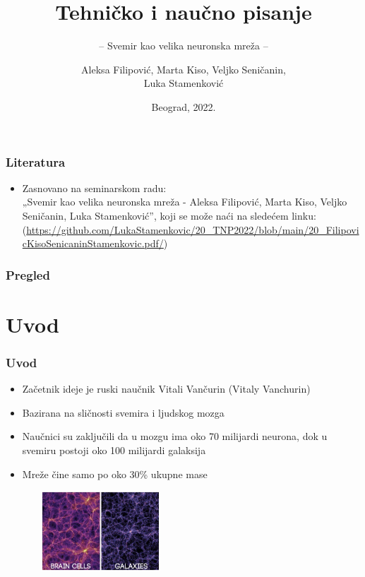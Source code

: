 \documentclass{beamer}
\title{Tehničko i naučno pisanje}
\subtitle{-- Svemir kao velika neuronska mreža --}
\author{Aleksa Filipović, Marta Kiso, Veljko Seničanin, \\Luka Stamenković}
\institute{Matematički fakultet\\Univerzitet u Beogradu}
\date{
	\footnotesize{Beograd, 2022.}	
}
\begin{document}
\begin{frame}
	\thispagestyle{empty}
	\titlepage
\end{frame}

\addtocounter{framenumber}{-1}

\begin{frame}[fragile]\frametitle{Literatura}
	\begin{itemize}
		\item Zasnovano na seminarskom radu:\\
        „Svemir kao velika neuronska mreža - Aleksa Filipović, Marta Kiso, Veljko Seničanin, Luka Stamenković”, koji se može naći na sledećem linku: (\url{https://github.com/LukaStamenkovic/20_TNP2022/blob/main/20_FilipovicKisoSenicaninStamenkovic.pdf/})
	\end{itemize}
\end{frame}

\begin{frame}
	\frametitle{Pregled} %
	\tableofcontents[hidesubsections]
\end{frame}

\section{Uvod}

\begin{frame}[fragile]\frametitle{Uvod}
	\begin{itemize}	
        \item Začetnik ideje je ruski naučnik Vitali Vančurin (Vitaly Vanchurin)
		\item Bazirana na sličnosti svemira i ljudskog mozga
        \item Naučnici su zaključili da u mozgu ima oko 70 milijardi neurona, dok u svemiru postoji oko 100 milijardi galaksija
        \item Mreže čine samo po oko 30\% ukupne mase
        \end{itemize}
       \begin{figure}[h]
        \centering
        \includegraphics[width=50mm,height=30mm, scale=0.5]{komparacija.jpeg}
        \label{fig:komparacija.jpeg}
        \end{figure}
        \end{frame}
        
\end{document}
